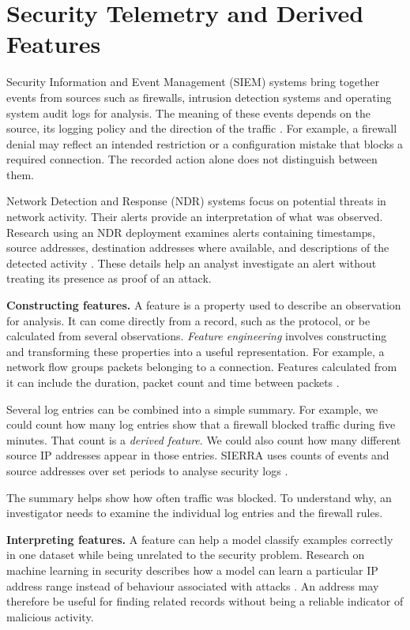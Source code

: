 \section{Security Telemetry and Derived Features}
\label{sec:background:security-telemetry}

Security Information and Event Management (SIEM) systems bring together
events from sources such as firewalls, intrusion detection systems and
operating system audit logs for analysis. The meaning of these events
depends on the source, its logging policy and the direction of the traffic
\parencite{lee2022sierra}. For example, a firewall denial may reflect an
intended restriction or a configuration mistake that blocks a required
connection. The recorded action alone does not distinguish between them.

Network Detection and Response (NDR) systems focus on potential threats in
network activity. Their alerts provide an interpretation of what was
observed. Research using an NDR deployment examines alerts containing
timestamps, source addresses, destination addresses where available, and
descriptions of the detected activity \parencite{homayoun2024ndrnoise}.
These details help an analyst investigate an alert without treating its
presence as proof of an attack.

\noindent\textbf{Constructing features.} A feature is a property used to
describe an observation for analysis. It can come directly from a record,
such as the protocol, or be calculated from several observations.
\emph{Feature engineering} involves constructing and transforming these
properties into a useful representation. For example, a network flow groups
packets belonging to a connection. Features calculated from it can include
the duration, packet count and time between packets
\parencite{engelen2021troubleshooting}.

Several log entries can be combined into a simple summary. For example,
we could count how many log entries show that a firewall blocked traffic
during five minutes. That count is a \emph{derived feature}. We could also
count how many different source IP addresses appear in those entries.
SIERRA uses counts of events and source addresses over set periods to
analyse security logs \parencite{lee2022sierra}.

The summary helps show how often traffic was blocked. To understand why,
an investigator needs to examine the individual log entries and the
firewall rules.

\noindent\textbf{Interpreting features.} A feature can help a model classify
examples correctly in one dataset while being unrelated to the security
problem. Research on machine learning in security describes how a model
can learn a particular IP address range instead of behaviour associated
with attacks \parencite{arp2022dosdonts}. An address may therefore be useful
for finding related records without being a reliable indicator of
malicious activity.

